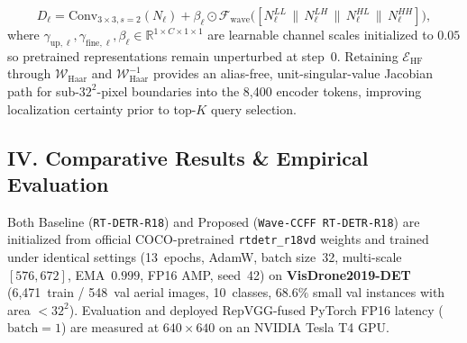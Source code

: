 \documentclass[8pt,a4paper]{article}
\begin{document}
\begin{equation}
D_\ell = \text{Conv}_{3\times 3, s=2}(N_\ell) + \beta_\ell \odot \mathcal{F}_{\text{wave}}\!\big([N_\ell^{LL} \,\|\, N_\ell^{LH} \,\|\, N_\ell^{HL} \,\|\, N_\ell^{HH}]\big),
\end{equation}
where $\gamma_{\text{up},\ell}, \gamma_{\text{fine},\ell}, \beta_\ell \in \mathbb{R}^{1\times C\times 1\times 1}$ are learnable channel scales initialized to $0.05$ so pretrained representations remain unperturbed at step~$0$. Retaining $\mathcal{E}_{\text{HF}}$ through $\mathcal{W}_{\text{Haar}}$ and $\mathcal{W}_{\text{Haar}}^{-1}$ provides an alias-free, unit-singular-value Jacobian path for sub-$32^2$-pixel boundaries into the 8,400 encoder tokens, improving localization certainty prior to top-$K$ query selection.

\subsection*{IV. Comparative Results \& Empirical Evaluation}
Both Baseline (\texttt{RT-DETR-R18}) and Proposed (\texttt{Wave-CCFF RT-DETR-R18}) are initialized from official COCO-pretrained \texttt{rtdetr\_r18vd} weights and trained under identical settings (13~epochs, AdamW, batch size~32, multi-scale $[576, 672]$, EMA~$0.999$, FP16 AMP, seed~42) on \textbf{VisDrone2019-DET} (6,471~train / 548~val aerial images, 10~classes, $68.6\%$ small val instances with area $<32^2$). Evaluation and deployed RepVGG-fused PyTorch FP16 latency ($\text{batch}=1$) are measured at $640 \times 640$ on an NVIDIA Tesla T4 GPU.
\end{document}
